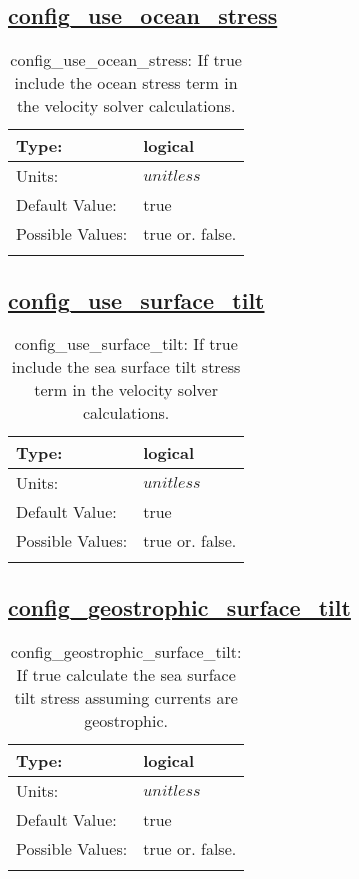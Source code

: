 \subsection[config\_use\_ocean\_stress]{\hyperref[sec:nm_tab_velocity_solver]{config\_use\_ocean\_stress}}
\label{subsec:nm_sec_config_use_ocean_stress}
\begin{center}
\begin{longtable}{| p{2.0in} || p{4.0in} |}
    \hline
    Type: & logical \\
    \hline
    Units: & $unitless$ \\
    \hline
    Default Value: & true \\
    \hline
    Possible Values: & true or. false. \\
    \hline
    \caption{config\_use\_ocean\_stress: If true include the ocean stress term in the velocity solver calculations.}
\end{longtable}
\end{center}
\subsection[config\_use\_surface\_tilt]{\hyperref[sec:nm_tab_velocity_solver]{config\_use\_surface\_tilt}}
\label{subsec:nm_sec_config_use_surface_tilt}
\begin{center}
\begin{longtable}{| p{2.0in} || p{4.0in} |}
    \hline
    Type: & logical \\
    \hline
    Units: & $unitless$ \\
    \hline
    Default Value: & true \\
    \hline
    Possible Values: & true or. false. \\
    \hline
    \caption{config\_use\_surface\_tilt: If true include the sea surface tilt stress term in the velocity solver calculations.}
\end{longtable}
\end{center}
\subsection[config\_geostrophic\_surface\_tilt]{\hyperref[sec:nm_tab_velocity_solver]{config\_geostrophic\_surface\_tilt}}
\label{subsec:nm_sec_config_geostrophic_surface_tilt}
\begin{center}
\begin{longtable}{| p{2.0in} || p{4.0in} |}
    \hline
    Type: & logical \\
    \hline
    Units: & $unitless$ \\
    \hline
    Default Value: & true \\
    \hline
    Possible Values: & true or. false. \\
    \hline
    \caption{config\_geostrophic\_surface\_tilt: If true calculate the sea surface tilt stress assuming currents are geostrophic.}
\end{longtable}
\end{center}
